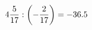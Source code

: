 \documentclass[preview]{standalone}
\begin{document}
\begin{align*}
4 { 5 \over 17 }  :  \left( - { 2 \over 17 } \right) = -36.5
\end{align*}
\end{document}
